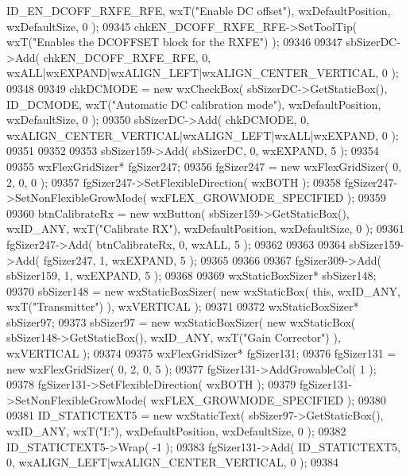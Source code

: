 \begin{DoxyCode}
      ID_EN_DCOFF_RXFE_RFE, wxT(\textcolor{stringliteral}{"Enable DC offset"}), wxDefaultPosition, wxDefaultSize, 0 );
09345     chkEN_DCOFF_RXFE_RFE->SetToolTip( wxT(\textcolor{stringliteral}{"Enables the DCOFFSET block for the RXFE"}) );
09346     
09347     sbSizerDC->Add( chkEN_DCOFF_RXFE_RFE, 0, wxALL|wxEXPAND|wxALIGN\_LEFT|wxALIGN\_CENTER\_VERTICAL, 0 );
09348     
09349     chkDCMODE = \textcolor{keyword}{new} wxCheckBox( sbSizerDC->GetStaticBox(), ID_DCMODE, wxT(\textcolor{stringliteral}{"Automatic DC calibration mode"}),
       wxDefaultPosition, wxDefaultSize, 0 );
09350     sbSizerDC->Add( chkDCMODE, 0, wxALIGN\_CENTER\_VERTICAL|wxALIGN\_LEFT|wxALL|wxEXPAND, 0 );
09351     
09352     
09353     sbSizer159->Add( sbSizerDC, 0, wxEXPAND, 5 );
09354     
09355     wxFlexGridSizer* fgSizer247;
09356     fgSizer247 = \textcolor{keyword}{new} wxFlexGridSizer( 0, 2, 0, 0 );
09357     fgSizer247->SetFlexibleDirection( wxBOTH );
09358     fgSizer247->SetNonFlexibleGrowMode( wxFLEX\_GROWMODE\_SPECIFIED );
09359     
09360     btnCalibrateRx = \textcolor{keyword}{new} wxButton( sbSizer159->GetStaticBox(), wxID\_ANY, wxT(\textcolor{stringliteral}{"Calibrate RX"}), 
      wxDefaultPosition, wxDefaultSize, 0 );
09361     fgSizer247->Add( btnCalibrateRx, 0, wxALL, 5 );
09362     
09363     
09364     sbSizer159->Add( fgSizer247, 1, wxEXPAND, 5 );
09365     
09366     
09367     fgSizer309->Add( sbSizer159, 1, wxEXPAND, 5 );
09368     
09369     wxStaticBoxSizer* sbSizer148;
09370     sbSizer148 = \textcolor{keyword}{new} wxStaticBoxSizer( \textcolor{keyword}{new} wxStaticBox( \textcolor{keyword}{this}, wxID\_ANY, wxT(\textcolor{stringliteral}{"Transmitter"}) ), wxVERTICAL );
09371     
09372     wxStaticBoxSizer* sbSizer97;
09373     sbSizer97 = \textcolor{keyword}{new} wxStaticBoxSizer( \textcolor{keyword}{new} wxStaticBox( sbSizer148->GetStaticBox(), wxID\_ANY, wxT(\textcolor{stringliteral}{"Gain
       Corrector"}) ), wxVERTICAL );
09374     
09375     wxFlexGridSizer* fgSizer131;
09376     fgSizer131 = \textcolor{keyword}{new} wxFlexGridSizer( 0, 2, 0, 5 );
09377     fgSizer131->AddGrowableCol( 1 );
09378     fgSizer131->SetFlexibleDirection( wxBOTH );
09379     fgSizer131->SetNonFlexibleGrowMode( wxFLEX\_GROWMODE\_SPECIFIED );
09380     
09381     ID_STATICTEXT5 = \textcolor{keyword}{new} wxStaticText( sbSizer97->GetStaticBox(), wxID\_ANY, wxT(\textcolor{stringliteral}{"I:"}), wxDefaultPosition, 
      wxDefaultSize, 0 );
09382     ID_STATICTEXT5->Wrap( -1 );
09383     fgSizer131->Add( ID_STATICTEXT5, 0, wxALIGN\_LEFT|wxALIGN\_CENTER\_VERTICAL, 0 );
09384     

\end{DoxyCode}
